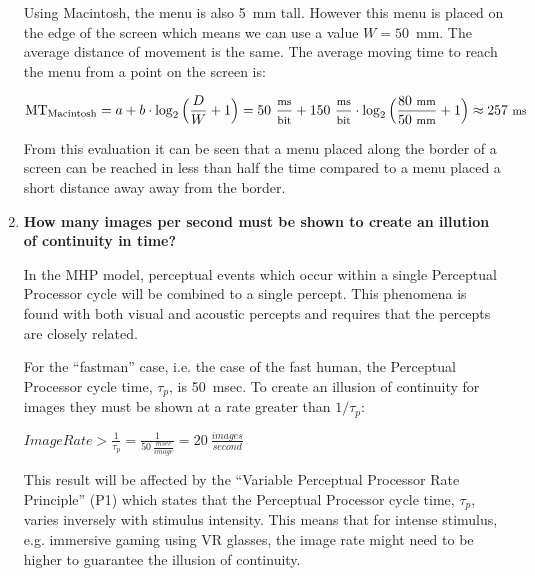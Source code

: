 \begin{enumerate}
Using Macintosh, the menu is also 5~mm tall. However this menu is placed on the edge of the screen which means we can use a value $W = 50$~mm. The average distance of movement is the same. The average moving time to reach the menu from a point on the screen is:

\begin{displaymath}
\text{MT}_\text{Macintosh} = a + b \cdot \log_2\Big(\frac{D}{W} + 1\Big) = 50~{\footnotesize \frac{\text{ms}}{\text{bit}}} + 150~{\footnotesize \frac{\text{ms}}{\text{bit}}} \cdot \log_2\Big(\frac{80~\text{\footnotesize mm}}{50~\text{\footnotesize mm}} + 1\Big) \approx 257~\text{\footnotesize ms}
\end{displaymath}

From this evaluation it can be seen that a menu placed along the border of a screen can be reached in less than half the time compared to a menu placed a short distance away away from the border.

\item \textbf{How many images per second must be shown to create an illution of continuity in time?}

In the \ac{MHP} model, perceptual events which occur within a single Perceptual Processor cycle will be combined to a single percept. This phenomena is found with both visual and acoustic percepts and requires that the percepts are closely related.

For the ``fastman'' case, i.e. the case of the fast human, the Perceptual Processor cycle time, $\tau_p$, is 50~msec. To create an illusion of continuity for images they must be shown at a rate greater than $1 / \tau_p$:

$\textit{ImageRate} > \frac{1}{\tau_p} = \frac{1}{50~\frac{\textit{msec}}{\textit{image}}} = 20~\frac{\textit{images}}{\textit{second}}$

This result will be affected by the ``Variable Perceptual Processor Rate Principle'' (P1) which states that the Perceptual Processor cycle time, $\tau_p$, varies inversely with stimulus intensity. This means that for intense stimulus, e.g. immersive gaming using \ac{VR} glasses, the image rate might need to be higher to guarantee the illusion of continuity.

\end{enumerate}



